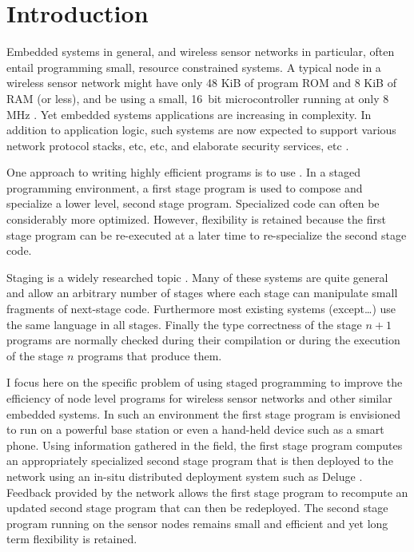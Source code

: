 \chapter{Introduction}
\label{chapter-introduction}

Embedded systems in general, and wireless sensor networks in particular, often entail
programming small, resource constrained systems. A typical node in a wireless sensor network
might have only 48 KiB of program ROM and 8 KiB of RAM (or less), and be using a small, 16~bit
microcontroller running at only 8 MHz \cite{XXX}. Yet embedded systems applications are
increasing in complexity. In addition to application logic, such systems are now expected to
support various network protocol stacks, etc, etc, and elaborate security services, etc
\cite{XXX}.

One approach to writing highly efficient programs is to use . In a staged
programming environment, a first stage program is used to compose and specialize a lower level,
second stage program. Specialized code can often be considerably more optimized. However,
flexibility is retained because the first stage program can be re-executed at a later time to
re-specialize the second stage code.

Staging is a widely researched topic
\cite{Taha-MetaML,Sheard-TemplateHaskell,Mainland-Flask-2008,FramedML}.  Many of these systems are quite general and allow an
arbitrary number of stages where each stage can manipulate small fragments of next-stage code.
Furthermore most existing systems (except\ldots) use the same language in all stages. Finally
the type correctness of the stage $n+1$ programs are normally checked during their compilation
or during the execution of the stage $n$ programs that produce them.

I focus here on the specific problem of using staged programming to improve the efficiency of
node level programs for wireless sensor networks and other similar embedded systems. In such an
environment the first stage program is envisioned to run on a powerful base station or even a
hand-held device such as a smart phone. Using information gathered in the field, the first stage
program computes an appropriately specialized second stage program that is then deployed to the
network using an in-situ distributed deployment system such as Deluge \cite{XXX}. Feedback
provided by the network allows the first stage program to recompute an updated second stage
program that can then be redeployed. The second stage program running on the sensor nodes
remains small and efficient and yet long term flexibility is retained.

